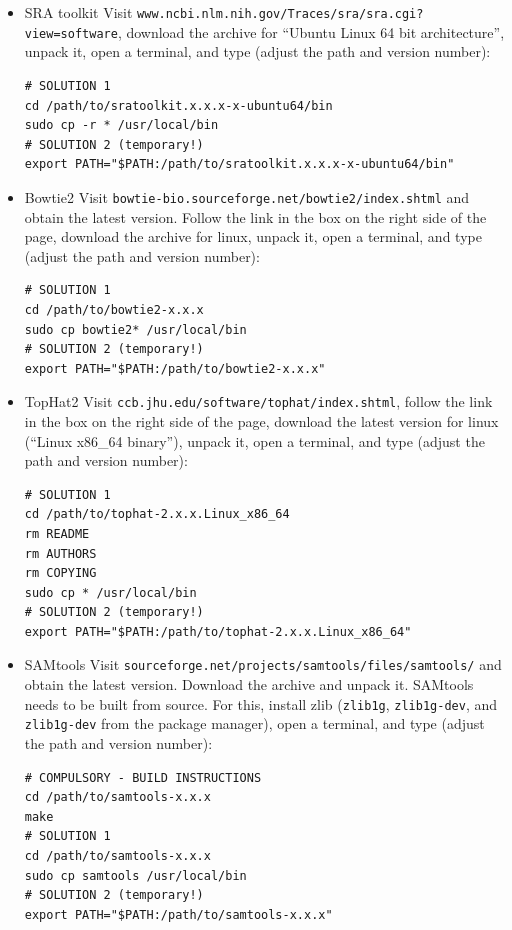 \documentclass[a4paper,10pt]{article}
\begin{document}
\begin{itemize}
 \item SRA toolkit\newline
Visit \texttt{www.ncbi.nlm.nih.gov/Traces/sra/sra.cgi?view=software}, download the archive for ``Ubuntu Linux 64 bit architecture'', unpack it, open a terminal, and type (adjust the path and version number):
\begin{verbatim}
# SOLUTION 1
cd /path/to/sratoolkit.x.x.x-x-ubuntu64/bin
sudo cp -r * /usr/local/bin
# SOLUTION 2 (temporary!)
export PATH="$PATH:/path/to/sratoolkit.x.x.x-x-ubuntu64/bin"
\end{verbatim}
 \item Bowtie2 \cite{2012_Langmead} \newline
Visit \texttt{bowtie-bio.sourceforge.net/bowtie2/index.shtml} and obtain the latest version. Follow the link in the box on the right side of the page, download the archive for linux, unpack it, open a terminal, and type (adjust the path and version number):
\begin{verbatim}
# SOLUTION 1
cd /path/to/bowtie2-x.x.x
sudo cp bowtie2* /usr/local/bin
# SOLUTION 2 (temporary!)
export PATH="$PATH:/path/to/bowtie2-x.x.x"
\end{verbatim}
\item TopHat2 \cite{2013_Kim} \newline
Visit \texttt{ccb.jhu.edu/software/tophat/index.shtml}, follow the link in the box on the right side of the page, download the latest version for linux (``Linux x86\_64 binary''), unpack it, open a terminal, and type (adjust the path and version number):
\begin{verbatim}
# SOLUTION 1
cd /path/to/tophat-2.x.x.Linux_x86_64
rm README
rm AUTHORS
rm COPYING
sudo cp * /usr/local/bin
# SOLUTION 2 (temporary!)
export PATH="$PATH:/path/to/tophat-2.x.x.Linux_x86_64"
\end{verbatim}
\item SAMtools \cite{2009_Li} \newline
Visit \texttt{sourceforge.net/projects/samtools/files/samtools/} and obtain the latest version. Download the archive and unpack it. SAMtools needs to be built from source. For this, install zlib (\texttt{zlib1g}, \texttt{zlib1g-dev}, and \texttt{zlib1g-dev} from the package manager), open a terminal, and type (adjust the path and version number):
\begin{verbatim}
# COMPULSORY - BUILD INSTRUCTIONS
cd /path/to/samtools-x.x.x
make
# SOLUTION 1
cd /path/to/samtools-x.x.x
sudo cp samtools /usr/local/bin
# SOLUTION 2 (temporary!)
export PATH="$PATH:/path/to/samtools-x.x.x"
\end{verbatim}
\end{itemize}
\end{document}
